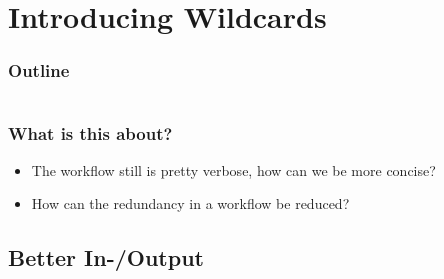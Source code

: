 \section{Introducing Wildcards}

\begin{frame}
    \frametitle{Outline}
    \begin{columns}[t]
        \begin{column}{.5\textwidth}
            \tableofcontents[sections={1-9},currentsection]
        \end{column}
        \begin{column}{.5\textwidth}
            \tableofcontents[sections={10-18},currentsection]
        \end{column}
    \end{columns}
\end{frame}

\begin{frame}
  \frametitle{What is this about?}
   \begin{question}[Questions]
   	 \begin{itemize}
        \item The workflow still is pretty verbose, how can we be more concise?
        \item How can the redundancy in a workflow be reduced?
     \end{itemize}
   \end{question}
\end{frame}

\subsection{Better In-/Output}

